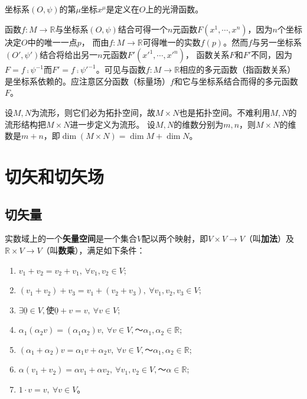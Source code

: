 \begin{example}
坐标系$(O, \psi)$的第$\mu$坐标$x^\mu$是定义在$O$上的光滑函数。
\end{example}

函数$f \colon M \to \mathbb{R}$与坐标系$(O, \psi)$结合可得一个$n$元函数$F(x^1, \cdots, x^n)$，因为$n$个坐标决定$O$中的唯一一点$p$，
而由$f \colon M \to \mathbb{R}$可得唯一的实数$f(p)$。然而$f$与另一坐标系$(O', \psi')$结合将给出另一$n$元函数$F'(x'^1, \cdots, x'^n)$，
函数关系$F$和$F'$不同，因为$F = f \comp \psi^{-1}$而$F' = f \comp \psi'^{-1}$。可见与函数$f \colon M \to \mathbb{R}$相应的多元函数（指函数关系）
是坐标系依赖的。应注意区分函数（标量场）$f$和它与坐标系结合而得的多元函数$F$。

设$M, N$为流形，则它们必为拓扑空间，故$M \times N$也是拓扑空间。不难利用$M, N$的流形结构把$M \times N$进一步定义为流形。
设$M, N$的维数分别为$m, n$，则$M \times N$的维数是$m + n$，即$\dim{(M \times N)} = \dim{M} + \dim{N}$。

\section{切矢和切矢场}

\subsection{切矢量}

\begin{definition}
实数域上的一个\textbf{矢量空间}是一个集合$V$配以两个映射，即$V \times V \to V$（叫\textbf{加法}）及$\mathbb{R} \times V \to V$（叫\textbf{数乘}），满足如下条件：
\begin{enumerate}[（a）]
\item $v_1 + v_2 = v_2 + v_1, ~ \forall v_1, v_2 \in V$;
\item $(v_1 + v_2) + v_3 = v_1 + (v_2 + v_3), ~ \forall v_1, v_2, v_3 \in V$;
\item $\exists \underline{0} \in V, \text{使} \underline{0} + v = v, ~ \forall v \in V$;
\item $\alpha_1(\alpha_2v) = (\alpha_1\alpha_2)v, ~ \forall v \in V, ～ \alpha_1, \alpha_2 \in \mathbb{R}$;
\item $(\alpha_1 + \alpha_2)v = \alpha_1v + \alpha_2v, ~ \forall v \in V, ～ \alpha_1, \alpha_2 \in \mathbb{R}$;
\item $\alpha(v_1 + v_2) = \alpha v_1 + \alpha v_2, ~ \forall v_1, v_2 \in V, ～ \alpha \in \mathbb{R}$;
\item $1 \cdot v = v, ~ \forall v \in V$。
\end{enumerate}
\end{definition}

